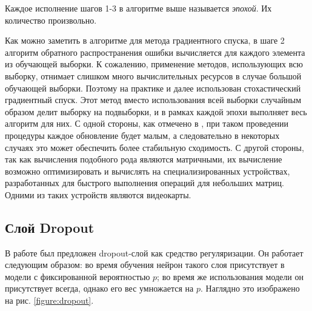 \documentclass[14pt, a4paper]{extarticle}
\begin{document}
Каждое исполнение шагов 1-3 в алгоритме выше называется \textit{эпохой}. Их количество произвольно.

Как можно заметить в алгоритме для метода градиентного спуска, в шаге 2 алгоритм обратного распространения ошибки вычисляется для каждого элемента из обучающей выборки. К сожалению, применение методов, использующих всю выборку, отнимает слишком много вычислительных ресурсов в случае большой обучающей выборки. Поэтому на практике и далее использован стохастический градиентный спуск. Этот метод вместо использования всей выборки случайным образом делит выборку на подвыборки, и в рамках каждой эпохи выполняет весь алгоритм для них. С одной стороны, как отмечено в \cite{sgd}, при таком проведении процедуры каждое обновление будет малым, а следовательно в некоторых случаях это может обеспечить более стабильную сходимость. С другой стороны, так как вычисления подобного рода являются матричными, их вычисление возможно оптимизировать и вычислять на специализированных устройствах, разработанных для быстрого выполнения операций для небольших матриц. Одними из таких устройств являются видеокарты.

\subsection*{Слой Dropout}
В работе \cite{dropout} был предложен dropout-слой как средство регуляризации. Он работает следующим образом: во время обучения нейрон такого слоя присутствует в модели с фиксированной вероятностью $p$; во время же использования модели он присутствует всегда, однако его вес умножается на $p$. Наглядно это изображено на рис. \ref{figure:dropout}.
\end{document}
